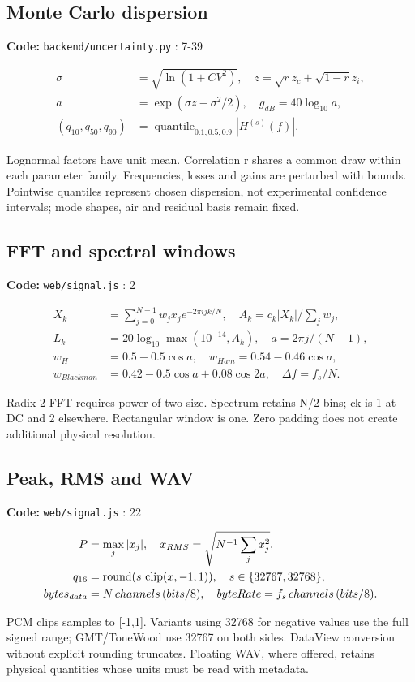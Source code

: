 \documentclass[10pt,a4paper]{article}
\newcommand{\loc}[1]{{\small\color{ink}\textbf{Code:} #1\par}}
\begin{document}
\begin{samepage}\subsection{Monte Carlo dispersion}
\loc{\texttt{backend/uncertainty.py} : 7-39}
\begin{align}\sigma&=\sqrt{\ln(1+CV^2)},\quad z=\sqrt{r}z_c+\sqrt{1-r}z_i,\\
a&=\exp(\sigma z-\sigma^2/2),\quad g_{dB}=40\log_{10}a,\\
(q_{10},q_{50},q_{90})&=\operatorname{quantile}_{0.1,0.5,0.9}|H^{(s)}(f)|.\end{align}

Lognormal factors have unit mean. Correlation r shares a common draw within each parameter family. Frequencies, losses and gains are perturbed with bounds. Pointwise quantiles represent chosen dispersion, not experimental confidence intervals; mode shapes, air and residual basis remain fixed.\par
\end{samepage}
\begin{samepage}\subsection{FFT and spectral windows}
\loc{\texttt{web/signal.js} : 2}
\begin{align}X_k&=\sum_{j=0}^{N-1}w_jx_je^{-2\pi i jk/N},\quad A_k=c_k|X_k|/\sum_jw_j,\\
L_k&=20\log_{10}\max(10^{-14},A_k),\quad a=2\pi j/(N-1),\\
w_H&=0.5-0.5\cos a,\quad w_{Ham}=0.54-0.46\cos a,\\
w_{Blackman}&=0.42-0.5\cos a+0.08\cos2a,\quad \Delta f=f_s/N.\end{align}

Radix-2 FFT requires power-of-two size. Spectrum retains N/2 bins; ck is 1 at DC and 2 elsewhere. Rectangular window is one. Zero padding does not create additional physical resolution.\par
\end{samepage}
\begin{samepage}\subsection{Peak, RMS and WAV}
\loc{\texttt{web/signal.js} : 22}
\begin{align}P&=\max_j|x_j|,\quad x_{RMS}=\sqrt{N^{-1}\sum_jx_j^2},\\
q_{16}&=\operatorname{round}(s\,\operatorname{clip}(x,-1,1)),\quad s\in\{32767,32768\},\\
bytes_{data}&=N\,channels\,(bits/8),\quad byteRate=f_s\,channels\,(bits/8).\end{align}

PCM clips samples to [-1,1]. Variants using 32768 for negative values use the full signed range; GMT/ToneWood use 32767 on both sides. DataView conversion without explicit rounding truncates. Floating WAV, where offered, retains physical quantities whose units must be read with metadata.\par
\end{samepage}
\end{document}
